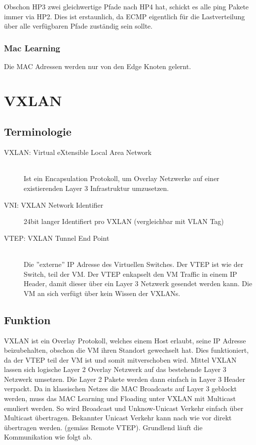 Obschon HP3 zwei gleichwertige Pfade nach HP4 hat, schickt es alle ping Pakete immer via HP2. Dies ist erstaunlich, da ECMP eigentlich für die Lastverteilung über alle verfügbaren Pfade zuständig sein sollte.

\subsubsection{Mac Learning}
Die MAC Adressen werden nur von den Edge Knoten gelernt. 


\section{VXLAN}
\subsection{Terminologie}
\begin{description}
	\item[VXLAN: Virtual eXtensible Local Area Network] \hfill \\
	Ist ein Encapsulation Protokoll, um Overlay Netzwerke auf einer existierenden Layer 3 Infrastruktur umzusetzen.
	\item[VNI: VXLAN Network Identifier]
	24bit langer Identifiert pro VXLAN (vergleichbar mit VLAN Tag)
	\item[VTEP: VXLAN Tunnel End Point] \hfill \\
	Die ''externe'' IP Adresse des Virtuellen Switches. Der VTEP ist wie der Switch, teil der VM. Der VTEP enkapselt den VM Traffic in einem IP Header, damit dieser über ein Layer 3 Netzwerk gesendet werden kann. Die VM an sich verfügt über kein Wissen der VXLANs.
\end{description}

\subsection{Funktion}
VXLAN ist ein Overlay Protokoll, welches einem Host erlaubt, seine IP Adresse beizubehalten, obschon die VM ihren Standort gewechselt hat. Dies funktioniert, da der VTEP teil der VM ist und somit mitverschoben wird. Mittel VXLAN lassen sich logische Layer 2 Overlay Netzwerk auf das bestehende Layer 3 Netzwerk umsetzen. Die Layer 2 Pakete werden dann einfach in Layer 3 Header verpackt. Da in klassischen Netzes die MAC Broadcasts auf Layer 3 geblockt werden, muss das MAC Learning und Floading unter VXLAN mit Multicast emuliert werden. So wird Broadcast und Unknow-Unicast Verkehr einfach über Multicast übertragen. Bekannter Unicast Verkehr kann nach wie vor direkt übertragen werden. (gemäss Remote VTEP). Grundlend läuft die Kommunikation wie folgt ab.

